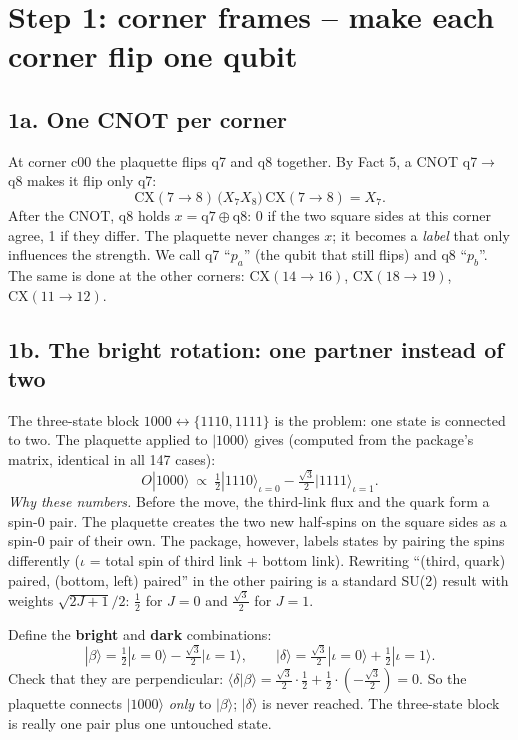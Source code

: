 \documentclass[11pt]{article}
\providecommand{\ket}[1]{|#1\rangle}
\newcommand{\CX}{\mathrm{CX}}
\begin{document}
\section{Step 1: corner frames -- make each corner flip one qubit}\label{sec:step1}

\subsection{1a. One CNOT per corner}

At corner c00 the plaquette flips q7 and q8 together.  By Fact 5, a CNOT q7$\to$q8 makes it flip only q7:
\[
\CX(7\to8)\,\big(X_7X_8\big)\,\CX(7\to8)=X_7 .
\]
After the CNOT, q8 holds $x=\text{q7}\oplus\text{q8}$: 0 if the two square sides at this corner agree, 1 if
they differ.  The plaquette never changes $x$; it becomes a \emph{label} that only influences the strength.
We call q7 ``$p_a$'' (the qubit that still flips) and q8 ``$p_b$''.  The same is done at the other corners:
$\CX(14\to16)$, $\CX(18\to19)$, $\CX(11\to12)$.

\subsection{1b. The bright rotation: one partner instead of two}

The three-state block $1000\leftrightarrow\{1110,1111\}$ is the problem: one state is connected to two.  The
plaquette applied to $\ket{1000}$ gives (computed from the package's matrix, identical in all 147 cases):
\[
O\ket{1000}\ \propto\ \tfrac12\ket{1110}_{\iota=0}-\tfrac{\sqrt3}{2}\ket{1111}_{\iota=1}.
\]
\emph{Why these numbers.}  Before the move, the third-link flux and the quark form a spin-0 pair.  The
plaquette creates the two new half-spins on the square sides as a spin-0 pair of their own.  The package,
however, labels states by pairing the spins differently ($\iota$ = total spin of third link + bottom link).
Rewriting ``(third, quark) paired, (bottom, left) paired'' in the other pairing is a standard SU(2) result
with weights $\sqrt{2J+1}/2$: $\tfrac12$ for $J=0$ and $\tfrac{\sqrt3}2$ for $J=1$.

Define the \textbf{bright} and \textbf{dark} combinations:
\[
\ket\beta=\tfrac12\ket{\iota{=}0}-\tfrac{\sqrt3}{2}\ket{\iota{=}1},\qquad
\ket\delta=\tfrac{\sqrt3}{2}\ket{\iota{=}0}+\tfrac12\ket{\iota{=}1}.
\]
Check that they are perpendicular: $\langle\delta|\beta\rangle=\tfrac{\sqrt3}2\cdot\tfrac12+\tfrac12\cdot(-\tfrac{\sqrt3}2)=0$.
So the plaquette connects $\ket{1000}$ \emph{only} to $\ket\beta$; $\ket\delta$ is never reached.  The three-state
block is really one pair plus one untouched state.
\end{document}
